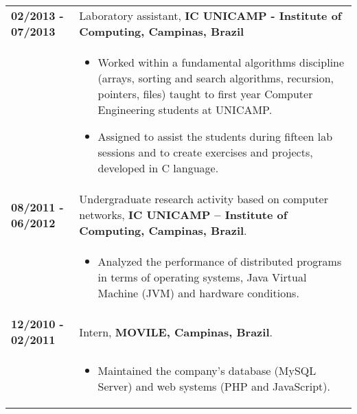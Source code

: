 \documentclass[10pt, a4paper]{article}
\begin{document}
\begin{tabular}{p{} p{}}
 \textbf{02/2013 - 07/2013}   & Laboratory assistant, \textbf{IC UNICAMP -
 Institute of Computing, Campinas, Brazil} \\
 & \vspace{-12pt} 
	 \begin {itemize} 
	   	\item Worked within a fundamental algorithms discipline (arrays, sorting and search algorithms, recursion, pointers, files)
	 taught to first year Computer Engineering students at UNICAMP. \vspace{-4pt}
	 	\item Assigned to assist the students during fifteen lab sessions and to
	 create exercises and projects, developed in C language.
	 \end{itemize} \\

 \textbf{08/2011 - 06/2012} & Undergraduate research activity based on computer
 networks, \textbf{IC UNICAMP – Institute of Computing, Campinas, Brazil}.   \\
 & 
 	\vspace{-12pt}
	\begin{itemize}
   	\item Analyzed the performance of distributed programs in terms of
 		operating systems, Java Virtual Machine (JVM) and hardware conditions.
 	\end{itemize} \\
 
 
 \textbf{12/2010 - 02/2011} & Intern, \textbf{MOVILE, Campinas, Brazil}.\\
 &
 \vspace{-12pt}
	\begin{itemize} 
 	\item Maintained the company’s database (MySQL Server) and web systems (PHP
 	and JavaScript).  
	\end {itemize} 	\\
 
\end{tabular}


% 
% 
% 

\end{document}
